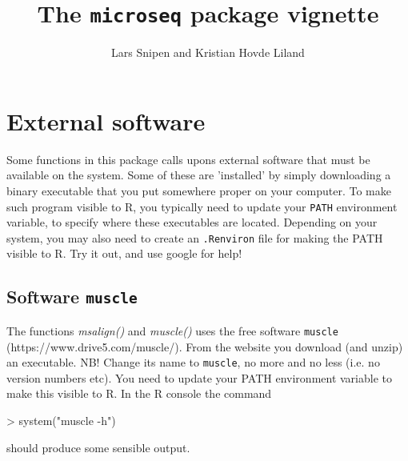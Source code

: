 \documentclass{article}
\title{The \texttt{microseq} package vignette}
\author{Lars Snipen and Kristian Hovde Liland}
\date{}
\begin{document}

\maketitle

\section{External software}
Some functions in this package calls upons external software that must be available on the system. Some of these are 'installed' by simply downloading a binary executable that you put somewhere proper on your computer. To make such program visible to R, you typically need to update your \texttt{PATH} environment variable, to specify where these executables are located. Depending on your system, you may also need to create an \texttt{.Renviron} file for making the PATH visible to R. Try it out, and use google for help!


\subsection{Software \texttt{muscle}}
The functions \emph{msalign()} and \emph{muscle()} uses the free software \texttt{muscle} (https://www.drive5.com/muscle/). From the website you download (and unzip) an executable. NB! Change its name to \texttt{muscle}, no more and no less (i.e. no version numbers etc). You need to update your PATH environment variable to make this visible to R. In the R console the command
\begin{Schunk}
\begin{Sinput}
> system("muscle -h")
\end{Sinput}
\end{Schunk}
should produce some sensible output.
\end{document}
